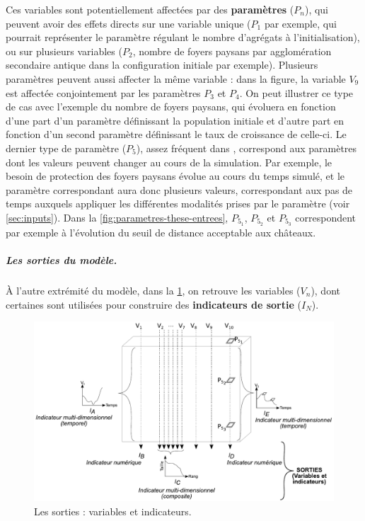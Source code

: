Ces variables sont potentiellement affectées par des \textbf{paramètres} ($P_n$), qui peuvent avoir des effets directs sur une variable unique ($P_1$ par exemple, qui pourrait représenter le paramètre régulant le nombre d'agrégats à l'initialisation), ou sur plusieurs variables ($P_2$, nombre de foyers paysans par agglomération secondaire antique dans la configuration initiale par exemple).
Plusieurs paramètres peuvent aussi affecter la même variable : dans la figure, la variable $V_9$ est affectée conjointement par les paramètres $P_3$ et $P_4$.
On peut illustrer ce type de cas avec l'exemple du nombre de foyers paysans, qui évoluera en fonction d'une part d'un paramètre définissant la population initiale et d'autre part en fonction d'un second paramètre définissant le taux de croissance de celle-ci.
Le dernier type de paramètre ($P_5$), assez fréquent dans \simfeodal{}, correspond aux paramètres dont les valeurs peuvent changer au cours de la simulation.
Par exemple, le besoin de protection des foyers paysans évolue au cours du temps simulé, et le paramètre correspondant aura donc plusieurs valeurs, correspondant aux pas de temps auxquels appliquer les différentes modalités prises par le paramètre (voir \cref{sec:inputs}).
Dans la \cref{fig:parametres-these-entrees}, $P_{5_1}$, $P_{5_2}$ et $P_{5_3}$ correspondent par exemple à l'évolution du seuil de distance acceptable aux châteaux.

\subparagraph{Les sorties du modèle.}
À l'autre extrémité du modèle, dans la \cref{fig:parametres-these-sorties}, on retrouve les variables ($V_n$), dont certaines sont utilisées pour construire des \textbf{indicateurs de sortie} ($I_N$).

\begin{figure}[H]
	\includegraphics[width=\linewidth]{img/schemas_params_2_sorties.pdf}
	\caption{Les sorties : variables et indicateurs.} 
	\label{fig:parametres-these-sorties} 
\end{figure}

